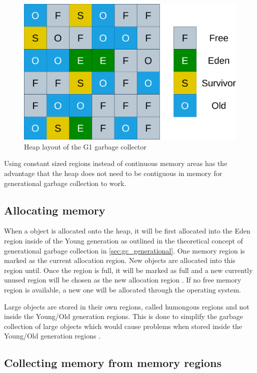 \begin{figure}[htbp]
    \centering
    \includegraphics[width=.7\textwidth]{images/G1_Heap_Layout.drawio.png}
    \caption{Heap layout of the G1 garbage collector}
    \label{fig:g1_heap_layout}
\end{figure}

Using constant sized regions instead of continuous memory areas has the advantage
that the heap does not need to be contiguous in memory for generational garbage collection to work.

\subsection{Allocating memory}

When a object is allocated onto the heap, it will be first allocated into the
Eden region inside of the Young generation as outlined in the theoretical concept
of generational garbage collection in \autoref{sec:gc_generational}.
One memory region is marked as the current allocation region.
New objects are allocated into this region until.
Once the region is full, it will be marked as full and a new currently unused region will be
chosen as the new allocation region \cite[2.1 Allocation]{java_g1_2004}.
If no free memory region is available, a new one will be allocated through the operating system.

Large objects are stored in their own regions, called humongous regions
and not inside the Young/Old generation regions.
This is done to simplify the garbage collection of large objects which
would cause problems when stored inside the Young/Old generation regions \cite[2.1 Heap Layout]{java_g1_2004}.

\subsection{Collecting memory from memory regions}

